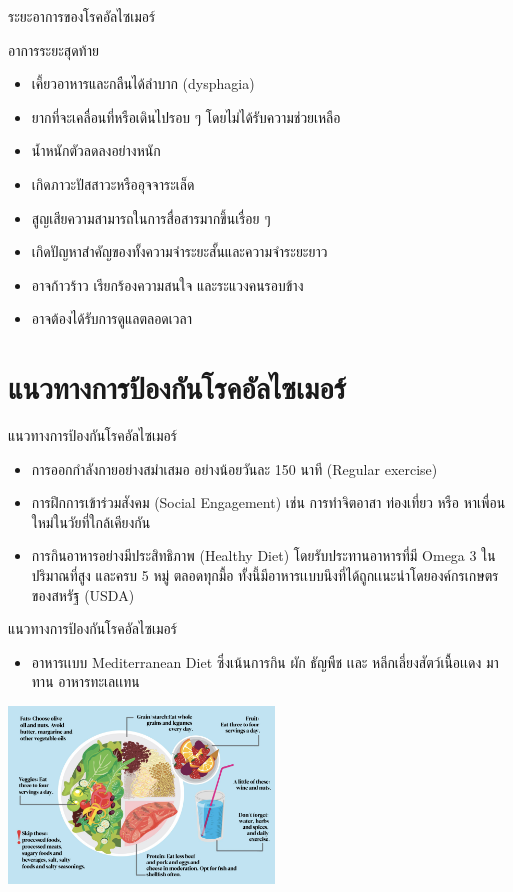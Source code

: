 \documentclass[xetex,serif]{beamer}
\begin{document}
\begin{frame}{ระยะอาการของโรคอัลไซเมอร์}

  {\Large อาการระยะสุดท้าย}

  \begin{itemize}
    \item เคี้ยวอาหารและกลืนได้ลำบาก (dysphagia)
    \item ยากที่จะเคลื่อนที่หรือเดินไปรอบ ๆ โดยไม่ได้รับความช่วยเหลือ
    \item น้ำหนักตัวลดลงอย่างหนัก
    \item เกิดภาวะปัสสาวะหรืออุจจาระเล็ด
    \item สูญเสียความสามารถในการสื่อสารมากขึ้นเรื่อย ๆ
    \item เกิดปัญหาสำคัญของทั้งความจำระยะสั้นและความจำระยะยาว
    \item อาจก้าวร้าว เรียกร้องความสนใจ และระแวงคนรอบข้าง
    \item อาจต้องได้รับการดูแลตลอดเวลา
  \end{itemize}
\end{frame}

\section{แนวทางการป้องกันโรคอัลไซเมอร์}

\begin{frame}{แนวทางการป้องกันโรคอัลไซเมอร์}
  \begin{itemize}
    \item การออกกําลังกายอย่างสมําเสมอ อย่างน้อยวันละ 150 นาที (Regular exercise) 
    \item การฝึกการเข้าร่วมสังคม (Social Engagement) เช่น การทําจิตอาสา ท่องเที่ยว หรือ หาเพื่อนใหม่ในวัยที่ใกล้เคียงกัน
    \item  การกินอาหารอย่างมีประสิทธิภาพ (Healthy Diet)  โดยรับประทานอาหารที่มี Omega 3 ในปริมาณที่สูง และครบ 5 หมู่ ตลอดทุกมื้อ ทั้งนี้มีอาหารเเบบนึงที่ได้ถูกเเนะนําโดยองค์กรเกษตรของสหรัฐ (USDA)
  \end{itemize}
\end{frame}

\begin{frame}{แนวทางการป้องกันโรคอัลไซเมอร์}
  \begin{itemize}
    \item อาหารเเบบ Mediterranean Diet ซึ่งเน้นการกิน ผัก ธัญพืช เเละ หลีกเลี่ยงสัตว์เนื้อเเดง มาทาน อาหารทะเลเเทน
  \end{itemize}
  \begin{center}
    \includegraphics[width=200pt]{file1.png}
  \end{center}

\end{frame}
\end{document}
